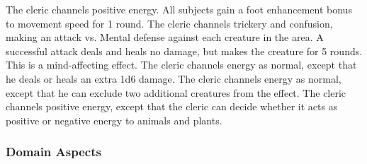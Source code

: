 The cleric channels positive energy.
All subjects gain a  foot enhancement bonus to movement speed for 1 round.
The cleric channels trickery and confusion, making an attack vs. Mental defense against each creature in the area.
A successful attack deals and heals no damage, but makes the creature \bewildered for 5 rounds.
This is a mind-affecting effect.
The cleric channels energy as normal, except that he deals or heals an extra 1d6 damage.
The cleric channels energy as normal, except that he can exclude two additional creatures from the effect.
The cleric channels positive energy, except that the cleric can decide whether it acts as positive or negative energy to animals and plants.

\subsubsection{Domain Aspects}\label{Domain Aspects}


